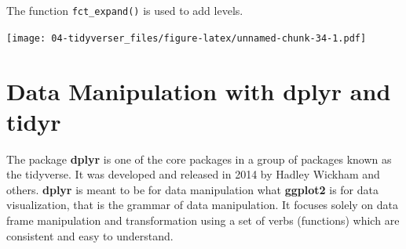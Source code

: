 \documentclass[
]{book}
\newenvironment{Shaded}{\begin{snugshade}}{\end{snugshade}}
\newcommand{\CommentTok}[1]{\textcolor[rgb]{0.56,0.35,0.01}{\textit{#1}}}
\newcommand{\FunctionTok}[1]{\textcolor[rgb]{0.00,0.00,0.00}{#1}}
\newcommand{\NormalTok}[1]{#1}
\newcommand{\SpecialCharTok}[1]{\textcolor[rgb]{0.00,0.00,0.00}{#1}}
\newcommand{\StringTok}[1]{\textcolor[rgb]{0.31,0.60,0.02}{#1}}
\begin{document}
The function \texttt{fct\_expand()} is used to add levels.

\begin{Shaded}
\end{Shaded}

\texttt{[image: 04-tidyverser\_files/figure-latex/unnamed-chunk-34-1.pdf]}

\hypertarget{data-manipulation-with-dplyr-and-tidyr}{%
\section{Data Manipulation with dplyr and tidyr}\label{data-manipulation-with-dplyr-and-tidyr}}

The package \textbf{dplyr} is one of the core packages in a group of packages known as the tidyverse. It was developed and released in 2014 by Hadley Wickham and others. \textbf{dplyr} is meant to be for data manipulation what \textbf{ggplot2} is for data visualization, that is the grammar of data manipulation. It focuses solely on data frame manipulation and transformation using a set of verbs (functions) which are consistent and easy to understand.
\end{document}
